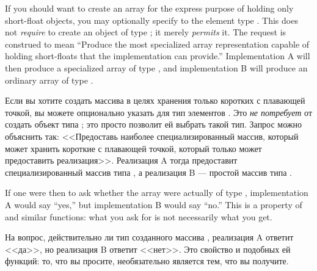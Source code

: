 If you should want to create an array for the
express purpose of holding only short-float objects, you may
optionally specify to  the element type
.  This does not \emph{require}  to create
an object of type ; it merely \emph{permits} it.  The
request is construed to mean ``Produce the most specialized array
representation capable of holding short-floats that the implementation
can provide.''  Implementation A will then produce a specialized
array of type , and implementation B
will produce an ordinary array of type .

Если вы хотите создать массива в целях хранения только коротких с плавающей
точкой, вы можете опционально указать для  тип элементов
. Это \emph{не потребует} от  создать объект типа
; это просто позволит ей выбрать такой тип. Запрос
можно объяснить так: <<Предоставь наиболее специализированный массив, который
может хранить короткие с плавающей точкой, который только может предоставить
реализация>>. Реализация A тогда предоставит специализированный массив типа
, а реализация B --- простой массив типа .

If one were then to ask whether the array were actually of type
, implementation A would say ``yes,'' but
implementation B would say ``no.''  This is a property of 
and similar functions: what you ask for is not necessarily what you get. 

На вопрос, действительно ли тип созданного массива ,
реализация A ответит <<да>>, но реализация B ответит <<нет>>. Это свойство
 и подобных ей функций: то, что вы просите, необязательно
является тем, что вы получите.

